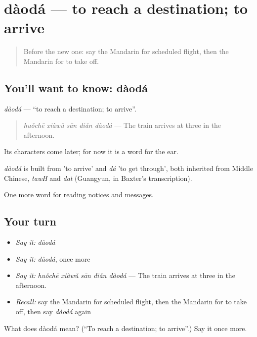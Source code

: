 \section[dàodá]{dàodá — to reach a destination; to arrive}

\label{lesson:ZH-C196-daoda}



\begin{quote}
Before the new one: say the Mandarin for scheduled flight, then the Mandarin for to take off.
\end{quote}

\subsection*{You'll want to know: dàodá}
\emph{dàodá} — \textquotedblleft{}to reach a destination; to arrive\textquotedblright{}.

\begin{quote}
\emph{huǒchē xiàwǔ sān diǎn dàodá} — The train arrives at three in the afternoon.
\end{quote}

Its characters come later; for now it is a word for the ear.

\begin{cousinweb}
\emph{dàodá} is built from  'to arrive' and \emph{dá} 'to get through', both inherited from Middle Chinese, \emph{tawH} and \emph{dat} (Guangyun, in Baxter's transcription).
\end{cousinweb}

\begin{grammarlens}[title={What you've built}]
One more word for reading notices and messages.
\end{grammarlens}

\subsection*{Your turn}
\begin{itemize}
\raggedright
  \item \emph{Say it:} \emph{dàodá}
  \item \emph{Say it:} \emph{dàodá}, once more
  \item \emph{Say it:} \emph{huǒchē xiàwǔ sān diǎn dàodá} — The train arrives at three in the afternoon.
  \item \emph{Recall:} say the Mandarin for scheduled flight, then the Mandarin for to take off, then say \emph{dàodá} again
\end{itemize}

\begin{tcolorbox}[breakable,colback=teal!4,colframe=teal!35!black,title={Before you move on}]
What does dàodá mean? (\textquotedblleft{}To reach a destination; to arrive\textquotedblright{}.) Say it once more.
\end{tcolorbox}
